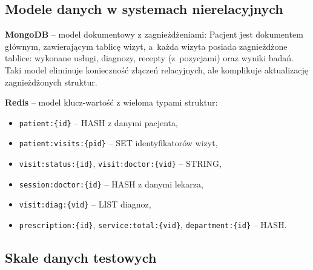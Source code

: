 \documentclass[12pt,a4paper]{article}
\begin{document}
\subsection{Modele danych w systemach nierelacyjnych}

\textbf{MongoDB} -- model dokumentowy z zagnieżdżeniami:
Pacjent jest dokumentem głównym, zawierającym tablicę wizyt, a~każda wizyta posiada zagnieżdżone tablice: wykonane usługi, diagnozy, recepty (z~pozycjami) oraz wyniki badań. Taki model eliminuje konieczność złączeń relacyjnych, ale komplikuje aktualizację zagnieżdżonych struktur.

\textbf{Redis} -- model klucz-wartość z wieloma typami struktur:
\begin{itemize}[noitemsep]
    \item \texttt{patient:\{id\}} -- HASH z danymi pacjenta,
    \item \texttt{patient:visits:\{pid\}} -- SET identyfikatorów wizyt,
    \item \texttt{visit:status:\{id\}}, \texttt{visit:doctor:\{vid\}} -- STRING,
    \item \texttt{session:doctor:\{id\}} -- HASH z danymi lekarza,
    \item \texttt{visit:diag:\{vid\}} -- LIST diagnoz,
    \item \texttt{prescription:\{id\}}, \texttt{service:total:\{vid\}}, \texttt{department:\{id\}} -- HASH.
\end{itemize}


\subsection{Skale danych testowych}
\end{document}
